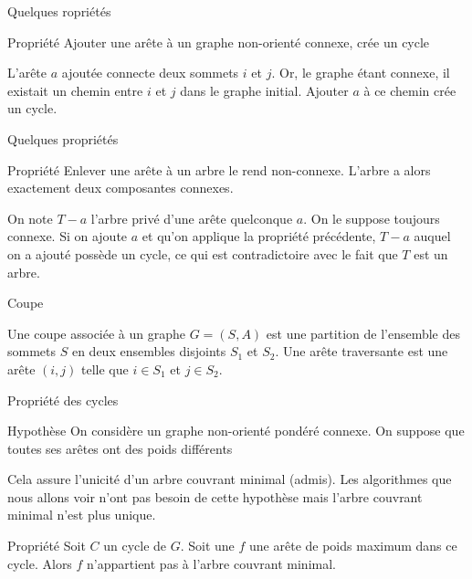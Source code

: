 \begin{frame}{Quelques ropriétés}
    \begin{block}{Propriété}
        Ajouter une arête à un graphe non-orienté connexe, crée un cycle
    \end{block}
    L'arête $a$ ajoutée connecte deux sommets $i$ et $j$. Or, le graphe étant connexe, il existait un chemin entre $i$ et $j$ dans le graphe initial. Ajouter $a$ à ce chemin crée un cycle.  
\end{frame}

\begin{frame}{Quelques propriétés}
    \begin{block}{Propriété}
        Enlever une arête à un arbre le rend non-connexe. L'arbre a alors exactement deux composantes connexes. 
    \end{block}
    On note $T-a$ l'arbre privé d'une arête quelconque $a$. On le suppose toujours connexe. Si on ajoute $a$ et qu'on applique la propriété précédente, $T-a$ auquel on a ajouté possède un cycle, ce qui est contradictoire avec le fait que $T$ est un arbre. 
\end{frame}

\begin{frame}{Coupe}
    \begin{definition}
        Une coupe associée à un graphe $G=(S,A)$ est une partition de l'ensemble des sommets $S$ en deux ensembles disjoints $S_1$ et $S_2$. Une arête traversante est une arête $(i,j)$ telle que $i \in S_1$ et $j \in S_2$. 
    \end{definition}
\end{frame}

\begin{frame}{Propriété des cycles}

    \begin{block}{Hypothèse}
        On considère un graphe non-orienté pondéré connexe. On suppose que toutes ses arêtes ont des poids différents
    \end{block}

    Cela assure l'unicité d'un arbre couvrant minimal (admis). Les algorithmes que nous allons voir n'ont pas besoin de cette hypothèse mais l'arbre couvrant minimal n'est plus unique. 
    
    \begin{block}{Propriété}
        Soit $C$ un cycle de $G$. Soit une $f$ une arête de poids maximum dans ce cycle. Alors $f$ n'appartient pas à l'arbre couvrant minimal.
    \end{block}

\end{frame}

